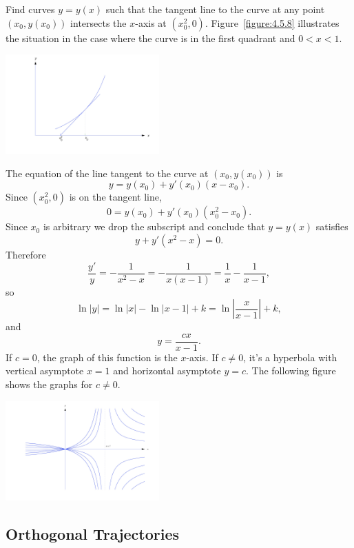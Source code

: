 \documentclass{ximera}
\begin{document}
\begin{example}\label{example:4.5.8}
Find curves $y=y(x)$ such that the tangent line to the curve at any
point $(x_0,y(x_0))$ intersects the $x$-axis at $(x^2_0,0)$.
Figure~\ref{figure:4.5.8} illustrates the situation in the case where
the curve is in the first quadrant and $0<x<1$.


\begin{image}
  \includegraphics[height=1.5in]{fig040508.jpg} 
\end{image}

\begin{explanation}
The equation of the line tangent to the curve at $(x_0,y(x_0))$ is
$$
y=y(x_0)+y'(x_0)(x-x_0).
$$
Since $(x^2_0,0)$ is on the tangent line,
$$
0=y(x_0)+y'(x_0)(x^2_0-x_0).
$$
Since $x_0$ is arbitrary we drop the subscript and conclude that
$y=y(x)$ satisfies
$$
y+y'(x^2-x)=0.
$$
Therefore
$$
\frac{y'}{y}=-\frac{1}{x^2-x}=-\frac{1}{x(x-1)}=\frac{1}{x}-\frac{1}{x-1},
$$
so
$$
\ln|y|=\ln|x|-\ln|x-1|+k=
\ln\left|\frac{x}{x-1}\right|+k,
$$
and
$$
y=\frac{cx}{x-1}.
$$
If $c=0$, the graph of this function is the $x$-axis.   If $c\neq 0$, it's
a hyperbola with vertical asymptote $x=1$ and horizontal asymptote
$y=c$. The following figure shows the graphs for $c\neq 0$.

\begin{image}
  \includegraphics[height=1.5in]{fig040509.jpg} 
\end{image}
\end{explanation}
\end{example}


\subsection*{Orthogonal Trajectories}
\end{document}
